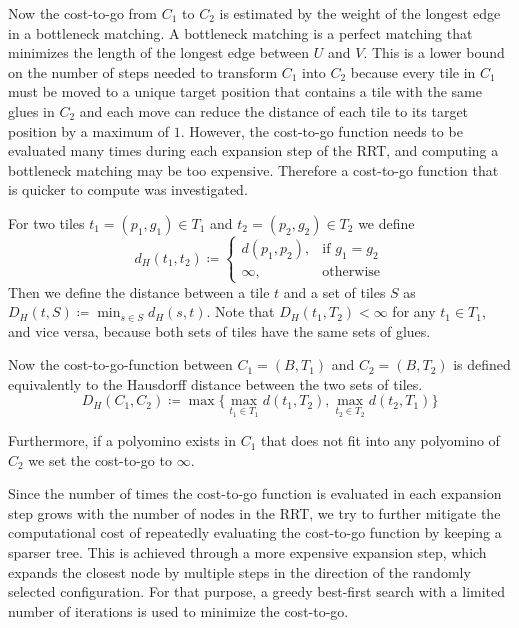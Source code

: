 Now the cost-to-go from $C_1$ to $C_2$ is estimated by the weight of the longest edge in a bottleneck matching. A bottleneck matching is a perfect matching that minimizes the length of the longest edge between $U$ and $V$. This is a lower bound on the number of steps needed to transform $C_1$ into $C_2$ because every tile in $C_1$ must be moved to a unique target position that contains a tile with the same glues in $C_2$ and each move can reduce the distance of each tile to its target position by a maximum of $1$.
However, the cost-to-go function needs to be evaluated many times during each expansion step of the RRT, and computing a bottleneck matching may be too expensive. Therefore a cost-to-go function that is quicker to compute was investigated. \par

For two tiles $t_1 = (p_1, g_1) \in T_1$ and $t_2 = (p_2, g_2) \in T_2$ we define
\begin{equation}
d_H(t_1, t_2) \coloneqq
\begin{cases}
d(p_1, p_2) , & \text{if } g_1 = g_2 \\
\infty , & \text{otherwise}
\end{cases}
\end{equation}
Then we define the distance between a tile $t$ and a set of tiles $S$ as $D_H(t, S) \coloneqq \min_{s \in S} d_H(s, t)$.
Note that $D_H(t_1, T_2) < \infty$ for any $t_1 \in T_1$, and vice versa, because both sets of tiles have the same sets of glues. \par

Now the cost-to-go-function between $C_1 = (B, T_1)$ and $C_2 = (B, T_2)$ is defined \mbox{equivalently} to the Hausdorff distance \cite{hausdorff} between the two sets of tiles.
\begin{equation}
D_H(C_1, C_2) \coloneqq \max \{	\max_{t_{1} \in T_{1}} d(t_1, T_2) , \max_{t_{2} \in T_{2}} d(t_2, T_1) \}
\end{equation}

Furthermore, if a polyomino exists in $C_1$ that does not fit into any polyomino of $C_2$ we set the cost-to-go to $\infty$. \par
Since the number of times the cost-to-go function is evaluated in each expansion step grows with the number of nodes in the RRT, we try to further mitigate the computational cost of repeatedly evaluating the cost-to-go function by keeping a sparser tree. This is achieved through a more expensive expansion step, which expands the closest node by multiple steps in the direction of the randomly selected configuration. For that purpose, a greedy best-first search with a limited number of iterations is used to minimize the cost-to-go. \par

